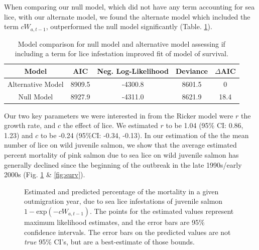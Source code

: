 \documentclass{article}
\begin{document}
When comparing our null model, which did not have any term accounting for sea lice, with our alternate model, we found the alternate model which included the term $c W_{a,t-1}$, outperformed the null model significantly (Table. \ref{table:1}). 

\begin{table}[h!]
\centering
\begin{tabular}{|c c c c c|} 
 \hline
 \textbf{Model} & \textbf{AIC} & \textbf{Neg. Log-Likelihood} & \textbf{Deviance} & \textbf{$\Delta$AIC} \\ [0.5ex] 
 \hline
  Alternative Model & 8909.5 & -4300.8 & 8601.5 & 0\\ 
  Null Model & 8927.9 & -4311.0 & 8621.9 &  18.4\\ [1ex] 
 \hline
\end{tabular}
\caption{Model comparison for null model and alternative model assessing if including a term for lice infestation improved fit of model of survival.}
\label{table:1}
\end{table}

Our two key parameters we were interested in from the Ricker model were $r$ the growth rate, and $c$ the effect of lice. We estimated $r$ to be 1.04 (95\% CI: 0.86, 1.23) and $c$ to be -0.24 (95\%CI: -0.34, -0.13). In our estimation of the the mean number of lice on wild juvenile salmon, we show that the average estimated percent mortality of pink salmon due to sea lice on wild juvenile salmon has generally declined since the beginning of the outbreak in the late 1990s/early 2000s (Fig. \ref{fig:est-mort} \& \ref{fig:surv}). 

\begin{figure}[h]
    \centering
    \caption{Estimated and predicted percentage of the mortality in a given outmigration year, due to sea lice infestations of juvenile salmon $1-\textrm{exp}(-cW_{a,t-1})$. The points for the estimated values represent maximum likelihood estimates, and the error bars are 95\% confidence intervals. The error bars on the predicted values are not \textit{true} 95\% CI's, but are a best-estimate of those bounds.}
    \label{fig:est-mort}
\end{figure} 
\end{document}
